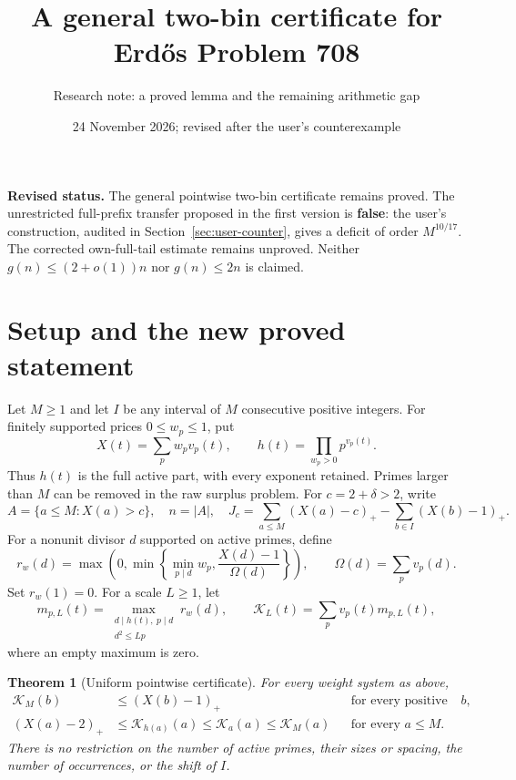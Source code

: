 \documentclass[a4paper,11pt]{article}
\title{A general two-bin certificate for Erd\H{o}s Problem 708}
\author{Research note: a proved lemma and the remaining arithmetic gap}
\date{24 November 2026; revised after the user's counterexample}
\newtheorem{theorem}{Theorem}
\theoremstyle{remark}\newtheorem{remark}[theorem]{Remark}
\newcommand{\pp}[1]{\left(#1\right)_+}
\newcommand{\K}{\mathcal K}
\newcommand{\Om}{\Omega}
\begin{document}
\maketitle
\noindent\textbf{Revised status.} The general pointwise two-bin certificate remains proved. The unrestricted full-prefix transfer proposed in the first version is \textbf{false}: the user's construction, audited in Section~\ref{sec:user-counter}, gives a deficit of order $M^{10/17}$. The corrected own-full-tail estimate remains unproved. Neither $g(n)\le(2+o(1))n$ nor $g(n)\le2n$ is claimed.

\section{Setup and the new proved statement}
Let $M\ge1$ and let $I$ be any interval of $M$ consecutive positive integers. For finitely supported prices $0\le w_p\le1$, put
\[
 X(t)=\sum_p w_pv_p(t),\qquad h(t)=\prod_{w_p>0}p^{v_p(t)}.
\]
Thus $h(t)$ is the full active part, with every exponent retained. Primes larger than $M$ can be removed in the raw surplus problem. For $c=2+\delta>2$, write
\[
 A=\{a\le M:X(a)>c\},\quad n=|A|,\quad
 J_c=\sum_{a\le M}\pp{X(a)-c}-\sum_{b\in I}\pp{X(b)-1}.
\]
For a nonunit divisor $d$ supported on active primes, define
\begin{equation}\label{eq:root}
 r_w(d)=\max\left(0,\min\left\{\min_{p\mid d}w_p,
                   \frac{X(d)-1}{\Om(d)}\right\}\right),
 \qquad \Om(d)=\sum_pv_p(d).
\end{equation}
Set $r_w(1)=0$. For a scale $L\ge1$, let
\begin{equation}\label{eq:kernel}
 m_{p,L}(t)=\max_{\substack{d\mid h(t),\ p\mid d\\d^2\le Lp}}r_w(d),
 \qquad \K_L(t)=\sum_pv_p(t)m_{p,L}(t),
\end{equation}
where an empty maximum is zero.

\begin{theorem}[Uniform pointwise certificate]\label{thm:arith}
For every weight system as above,
\begin{align}
 \K_M(b)&\le\pp{X(b)-1} &&\text{for every positive integer }b,\label{eq:target}\\
 \pp{X(a)-2}&\le\K_{h(a)}(a)\le\K_a(a)\le\K_M(a)
                   &&\text{for every }a\le M.\label{eq:source}
\end{align}
There is no restriction on the number of active primes, their sizes or spacing, the number of occurrences, or the shift of $I$.
\end{theorem}
\end{document}

